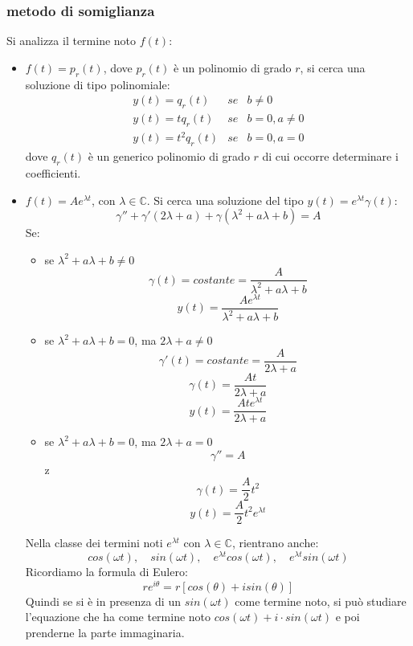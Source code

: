 \subsubsection{metodo di somiglianza}
Si analizza il termine noto $f(t)$:
\begin{itemize}
    \item $f(t) = p_r(t)$, dove $p_r(t)$ è un polinomio di grado $r$, si cerca una soluzione di tipo polinomiale:
    \[
        \begin{matrix}
            y(t) = q_r(t)  &se &b\neq0\\
            y(t) = tq_r(t) &se &b=0, a\neq 0\\
            y(t)=t^2q_r(t) &se &b=0, a=0
        \end{matrix}
    \]
    dove $q_r(t)$ è un generico polinomio di grado $r$ di cui occorre determinare i coefficienti.
    \item $f(t) = Ae^{\lambda t}$, con $\lambda \in \mathbb{C}$. Si cerca una soluzione del tipo $y(t) = e^{\lambda t}\gamma(t)$:
    \[
        \gamma'' + \gamma'(2 \lambda + a) + \gamma (\lambda^2 + a \lambda + b) = A
    \]
    Se:
    \begin{itemize}
        \item se $\lambda^2 + a \lambda + b \neq 0$
        \[
            \gamma(t) = costante = \frac{A}{\lambda^2 + a \lambda + b}
        \]
        \[
            y(t) =\frac{Ae^{\lambda t}}{\lambda^2 + a \lambda + b}
        \]
        \item se $\lambda^2 + a \lambda + b = 0$, ma $2 \lambda + a \neq 0$
        \[
            \gamma'(t) = costante = \frac{A}{2 \lambda + a}
        \]
        \[
            \gamma(t) = \frac{At}{2 \lambda + a}
        \]
        \[
            y(t) = \frac{At e^{\lambda t}}{2 \lambda + a}
        \]
        \item se $\lambda^2 + a \lambda + b = 0$, ma $2 \lambda + a = 0$
        \[
            \gamma''= A
        \]z
        \[
            \gamma(t) = \frac{A}{2}t^2
        \]
        \[
            y(t) = \frac{A}{2}t^2e^{\lambda t}
        \]
    \end{itemize}
    Nella classe dei termini noti $e^{\lambda t}$ con $\lambda \in \mathbb{C}$, rientrano anche:
    \[
        cos(\omega t), \quad sin(\omega t), \quad e^{\lambda t}cos(\omega t), \quad e^{\lambda t}sin(\omega t)
    \]
    Ricordiamo la formula di Eulero:
    \[
        re^{i \theta} =r[cos(\theta) + i sin(\theta)]
    \]
    Quindi se si è in presenza di un $sin(\omega t)$ come termine noto, si può studiare l'equazione che ha come termine noto $cos(\omega t) + i \cdot sin(\omega t)$ e poi prenderne la parte immaginaria.\newline

\end{itemize}
